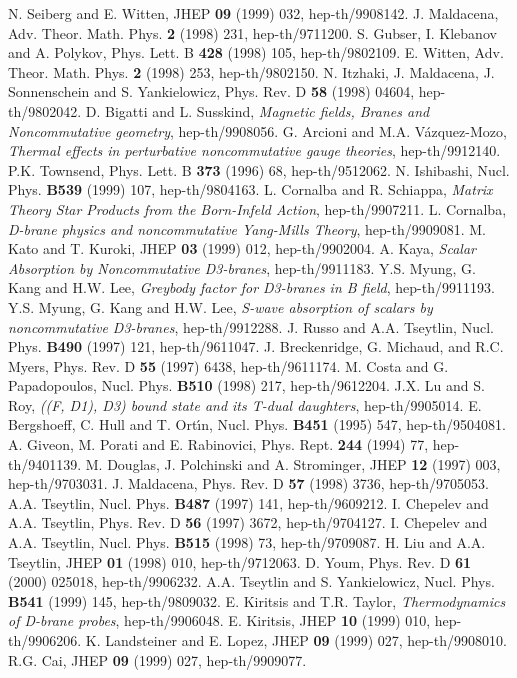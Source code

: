 \documentclass[a4paper,12pt]{article}
\begin{document}
\begin{thebibliography}{99}
N. Seiberg and E. Witten, JHEP {\bf 09} (1999) 032,
  hep-th/9908142.
J. Maldacena, Adv. Theor. Math. Phys. {\bf 2} (1998) 231,
  hep-th/9711200.
S. Gubser, I. Klebanov and A. Polykov, Phys. Lett. B
  {\bf 428} (1998) 105, hep-th/9802109.
E. Witten, Adv. Theor. Math. Phys. {\bf 2} (1998) 253,
  hep-th/9802150.
N. Itzhaki, J. Maldacena, J. Sonnenschein and
  S. Yankielowicz, Phys. Rev. D {\bf 58} (1998) 04604, hep-th/9802042.
D. Bigatti and L. Susskind, {\it Magnetic fields, Branes and
  Noncommutative geometry}, hep-th/9908056.
G. Arcioni and M.A. V\'azquez-Mozo, {\it Thermal effects
  in perturbative noncommutative gauge theories}, hep-th/9912140.
 P.K. Townsend, Phys. Lett. B {\bf 373} (1996) 68, hep-th/9512062.
N. Ishibashi, Nucl. Phys. {\bf B539} (1999) 107,
 hep-th/9804163.
L. Cornalba and R. Schiappa, {\it Matrix Theory Star Products
           from the Born-Infeld Action}, hep-th/9907211.
L. Cornalba, {\it D-brane physics and noncommutative Yang-Mills
  Theory}, hep-th/9909081.
 M. Kato and T. Kuroki, JHEP {\bf 03} (1999) 012,
         hep-th/9902004.
A. Kaya, {\it Scalar Absorption by Noncommutative D3-branes},
  hep-th/9911183.
Y.S. Myung, G. Kang and H.W. Lee, {\it Greybody factor
  for D3-branes in B field}, hep-th/9911193.
Y.S. Myung, G. Kang and H.W. Lee, {\it S-wave absorption
  of scalars by noncommutative D3-branes}, hep-th/9912288.
J. Russo and A.A. Tseytlin, Nucl. Phys. {\bf B490} (1997) 121,
  hep-th/9611047.
J. Breckenridge, G. Michaud, and R.C. Myers, Phys. Rev.
  D {\bf 55} (1997) 6438, hep-th/9611174.
M. Costa and G. Papadopoulos, Nucl. Phys. {\bf B510} (1998) 217,
        hep-th/9612204.
J.X. Lu and S. Roy, {\it ((F, D1), D3) bound state and its T-dual
  daughters}, hep-th/9905014.
E. Bergshoeff, C. Hull and T. Ort\'{\i}n, Nucl. Phys. {\bf B451}
  (1995) 547, hep-th/9504081.
 A. Giveon, M. Porati and E. Rabinovici, Phys. Rept. {\bf 244}
  (1994) 77, hep-th/9401139.
M. Douglas, J. Polchinski and A. Strominger, JHEP {\bf 12}
  (1997) 003, hep-th/9703031.
J. Maldacena, Phys. Rev. D {\bf 57} (1998) 3736,
  hep-th/9705053.
A.A. Tseytlin, Nucl. Phys. {\bf B487} (1997) 141,
  hep-th/9609212.
I. Chepelev and A.A. Tseytlin, Phys. Rev. D {\bf 56}
  (1997) 3672, hep-th/9704127.
I. Chepelev and A.A. Tseytlin, Nucl. Phys. {\bf B515}
  (1998) 73, hep-th/9709087.
H. Liu and A.A. Tseytlin, JHEP {\bf 01} (1998) 010,
  hep-th/9712063.
D. Youm, Phys. Rev. D {\bf 61} (2000) 025018,
  hep-th/9906232.
A.A. Tseytlin and S. Yankielowicz, Nucl. Phys. {\bf B541}
  (1999) 145, hep-th/9809032.
E. Kiritsis and T.R. Taylor, {\it Thermodynamics of D-brane
  probes}, hep-th/9906048.
E. Kiritsis, JHEP {\bf 10} (1999) 010, hep-th/9906206.
K. Landsteiner and E. Lopez, JHEP {\bf 09} (1999) 027,
  hep-th/9908010.
R.G. Cai, JHEP {\bf 09} (1999) 027, hep-th/9909077.
\end{thebibliography}
\end{document}
